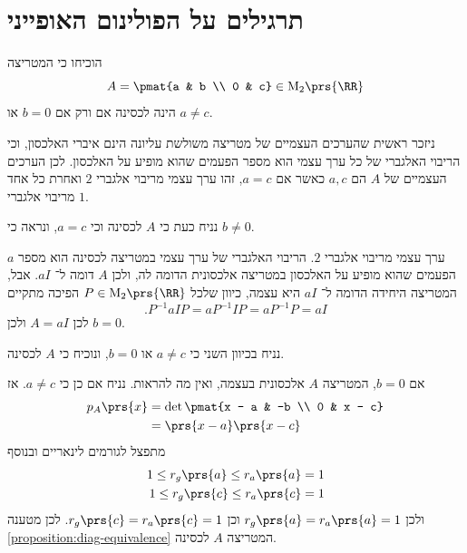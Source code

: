 \documentclass[a4paper,10pt,twoside,openany]{book}
\renewcommand{\Mat}{\mathrm{M}}
\begin{document}
\section{תרגילים על הפולינום האופייני}

\begin{exercisechap}
הוכיחו כי המטריצה
\[A = \pmat{a & b \\ 0 & c} \in \Mat_2\prs{\RR}\]
הינה לכסינה אם ורק אם
$b = 0$
או
$a \neq c$.
\end{exercisechap}

\begin{solution}
ניזכר ראשית שהערכים העצמיים של מטריצה משולשת עליונה הינם איברי האלכסון, וכי הריבוי האלגברי של כל ערך עצמי הוא מספר הפעמים שהוא מופיע על האלכסון. לכן הערכים העצמיים של
$A$
הם
$a,c$
כאשר אם
$a = c$,
זהו ערך עצמי מריבוי אלגברי
$2$
ואחרת כל אחד מריבוי אלגברי
$1$.

נניח כעת כי
$A$
לכסינה וכי
$a=c$,
ונראה כי
$b \neq 0$.

$a$
ערך עצמי מריבוי אלגברי
$2$.
הריבוי האלגברי של ערך עצמי במטריצה לכסינה הוא מספר הפעמים שהוא מופיע על האלכסון במטריצה אלכסונית הדומה לה, ולכן
$A$
דומה ל־%
$a I$.
אבל, המטריצה היחידה הדומה ל־%
$a I$
היא עצמה, כיוון שלכל
$P \in \Mat_2\prs{\RR}$
הפיכה מתקיים
\[\text{.} P^{-1} a I P = a P^{-1} I P = a P^{-1} P = a I\]
לכן
$A = aI$
ולכן
$b = 0$.

נניח בכיוון השני כי
$a \neq c$
או
$b = 0$,
ונוכיח כי
$A$
לכסינה.

אם
$b = 0$,
המטריצה
$A$
אלכסונית בעצמה, ואין מה להראות. נניח אם כן כי
$a \neq c$.
אז
\begin{align*}
p_A\prs{x} &= \det\pmat{x - a & -b \\ 0 & x - c}
\\&= \prs{x-a}\prs{x-c}
\end{align*}
מתפצל לגורמים לינאריים ובנוסף
\begin{align*}
1 \leq r_g\prs{a} \leq r_a\prs{a} = 1 \\
1 \leq r_g\prs{c} \leq r_a\prs{c} = 1
\end{align*}
ולכן
$r_g\prs{a} = r_a\prs{a} = 1$
וכן
$r_g\prs{c} = r_a\prs{c} = 1$.
לכן מטענה
\ref{proposition:diag-equivalence}
המטריצה
$A$
לכסינה.
\end{solution}
\end{document}
